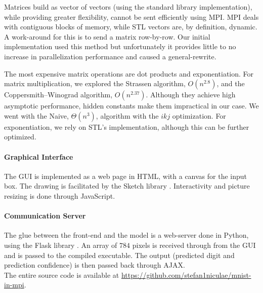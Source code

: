 \documentclass[a4paper]{article}
\begin{document}
Matrices build as vector of vectors (using the standard library implementation), while providing greater flexibility, cannot be sent efficiently using MPI. MPI deals with contiguous blocks of memory, while STL vectors are, by definition, dynamic. A work-around for this is to send a matrix row-by-row. Our initial implementation used this method but unfortunately it provides little to no increase in parallelization performance and caused a general-rewrite. 

The most expensive matrix operations are dot products and exponentiation. For matrix multiplication, we explored the Strassen algorithm, $O(n^{2.8})$, and the Coppersmith–Winograd algorithm, $O(n^{2.37})$. Although they achieve high asymptotic performance, hidden constants make them impractical in our case. We went with the Naive, $\Theta(n^3)$, algorithm with the $ikj$ optimization. For exponentiation, we rely on STL's implementation, although this can be further optimized.

\paragraph{Graphical Interface} The GUI is implemented as a web page in HTML, with a canvas for the input box.
The drawing is facilitated by the Sketch library \cite{sketch}. Interactivity and picture resizing is done through JavaScript.

\paragraph{Communication Server} The glue between the front-end and the model is a web-server done in Python, using the Flask library \cite{flask}. An array of $784$ pixels is received through from the GUI and is passed to the compiled executable. The output (predicted digit and prediction confidence) is then passed back through AJAX.
\\

\noindent The entire source code is available at \url{https://github.com/stefan1niculae/mnist-in-mpi}.

\vspace{\fill} %

    
    
\end{document}

